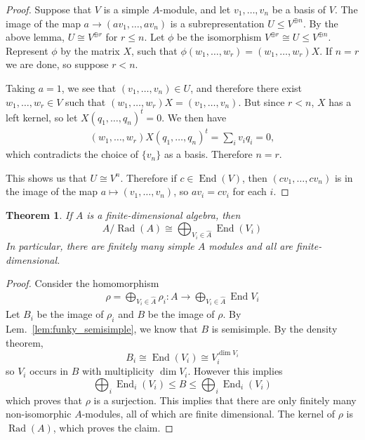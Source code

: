 \documentclass[11pt]{article}
\newtheorem{thm}{Theorem}
\theoremstyle{definition}
\newcommand{\End}{\operatorname{End}}
\newcommand{\Rad}{\operatorname{Rad}}
\begin{document}
\begin{proof}
  Suppose that $V$ is a simple $A$-module, and let $v_1, \dots, v_n$ be a basis of $V$.
  The image of the map $a \to (av_1, \dots, av_n)$ is a subrepresentation
  $U \leq V^{\oplus n}$. By the above lemma, $U \cong V^{\oplus r}$ for $r \leq
  n$. Let $\phi$ be the isomorphism $V^{\oplus r} \cong U \leq V^{\oplus n}$.
  Represent $\phi$ by the matrix $X$, such that $\phi(w_1, \dots, w_r) = (w_1,
  \dots, w_r)X$. If $n = r$ we are done, so suppose $r < n$.

  Taking $a = 1$, we see that $(v_1, \dots, v_n) \in
  U$,  and therefore there exist $w_1, \dots, w_r \in V$ such that $(w_1, \dots,
  w_r)X = (v_1, \dots, v_n)$. But since $r < n$, $X$ has a left kernel, so let
  $X(q_1, \dots, q_n)^t = 0$. We then have
  \begin{align}
    (w_1, \dots, w_r)X(q_1, \dots, q_n)^t = \sum_i v_iq_i = 0,
  \end{align}
  which contradicts the choice of $\{v_n\}$ as a basis. Therefore $n = r$.

  This shows us that $U \cong V^n$. Therefore 
  if $c \in \End(V)$, then 
  $(cv_1, \dots, cv_n)$ is in the image of the map $a \mapsto (v_1,
  \dots, v_n)$, so $av_i = cv_i$ for each $i$.

\end{proof}

\begin{thm}\label{prop:PeterWeyl}
If $A$ is a finite-dimensional algebra, then 
\begin{equation}
  A/\Rad(A) \cong \bigoplus_{V_i \in \hat A} \End(V_i)
\end{equation}
In particular, there are finitely many simple $A$ modules and all are finite-dimensional.
\end{thm}

\begin{proof}
  Consider the homomorphism
\begin{align}
  \rho = \bigoplus_{V_i \in \hat A} \rho_{i} : A \to \bigoplus_{V_i \in \hat A} \End V_i
\end{align}
Let $B_i$ be the image of $\rho_i$ and $B$ be the image of $\rho$. By
Lem.~\ref{lem:funky_semisimple}, we know that $B$ is semisimple. By the density theorem,
\begin{equation}
  B_i \cong \End(V_i) \cong V_i^{\dim V_i}
\end{equation}
so $V_i$ occurs in $B$ with multiplicity $\dim V_i$. However this implies
\begin{equation}
\bigoplus_i \End_i(V_i)  \leq B \leq \bigoplus_i \End_i(V_i)
\end{equation}
which proves that $\rho$ is a surjection.
This implies that there are only finitely many non-isomorphic
$A$-modules, all of which are finite dimensional. The kernel of $\rho$ is $\Rad(A)$, which proves the claim.
\end{proof}
\end{document}
